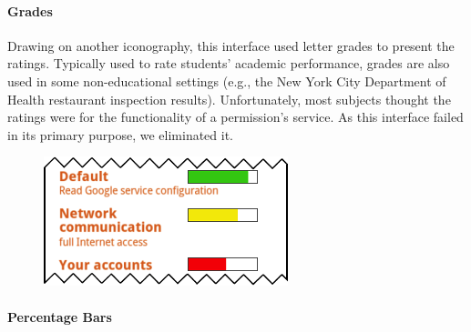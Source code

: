 \documentclass[11pt]{article}
\begin{document}
\paragraph{Grades}
\label{s-sec-grades}

Drawing on another iconography, this 
interface used letter grades to present the ratings. 
Typically used to rate students' academic performance, 
grades are also used in some non-educational settings (e.g., 
the New York City Department of Health restaurant 
inspection results).
\label{ss-sec-grades-r1}
Unfortunately, most subjects thought the ratings were for 
the functionality of a permission's service. As this interface failed
in its primary purpose, we eliminated it.


\begin{figure}
\begin{center}
\includegraphics[width=.9\linewidth]{candidate-img/bars/barsR1.png}
\end{center}
\end{figure}

\paragraph{Percentage Bars}
\label{s-sec-pbars}
\end{document}
